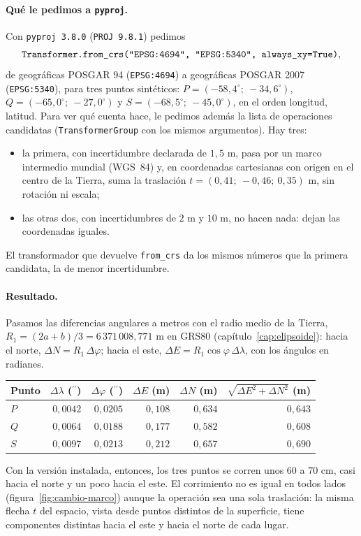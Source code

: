 \paragraph{Qué le pedimos a \texttt{pyproj}.} Con \texttt{pyproj 3.8.0} (\texttt{PROJ 9.8.1}) pedimos
\[
\texttt{Transformer.from\_crs(\textquotedbl{}EPSG:4694\textquotedbl{}, \textquotedbl{}EPSG:5340\textquotedbl{}, always\_xy=True)},
\]
de geográficas POSGAR 94 (\texttt{EPSG:4694}) a geográficas POSGAR 2007 (\texttt{EPSG:5340}),
para tres puntos sintéticos: \(P=(-58{,}4^\circ;\ -34{,}6^\circ)\),
\(Q=(-65{,}0^\circ;\ -27{,}0^\circ)\) y \(S=(-68{,}5^\circ;\ -45{,}0^\circ)\), en el orden
longitud, latitud. Para ver qué cuenta hace, le pedimos además la lista de operaciones
candidatas (\texttt{TransformerGroup} con los mismos argumentos). Hay tres:
\begin{itemize}
  \item la primera, con incertidumbre declarada de \(1{,}5\) m, pasa por un marco intermedio
  mundial (WGS~84) y, en coordenadas cartesianas con origen en el centro de la Tierra, suma la
  traslación \(t=(0{,}41;\ -0{,}46;\ 0{,}35)\) m, sin rotación ni escala;
  \item las otras dos, con incertidumbres de \(2\) m y \(10\) m, no hacen nada: dejan las
  coordenadas iguales.
\end{itemize}
El transformador que devuelve \texttt{from\_crs} da los mismos números que la primera
candidata, la de menor incertidumbre.

\paragraph{Resultado.} Pasamos las diferencias angulares a metros con el radio medio de la
Tierra, \(R_1=(2a+b)/3=6\,371\,008{,}771\) m en GRS80 (capítulo~\ref{cap:elipsoide}): hacia el
norte, \(\Delta N=R_1\,\Delta\varphi\); hacia el este, \(\Delta E=R_1\cos\varphi\,\Delta\lambda\),
con los ángulos en radianes.
\begin{center}
\begin{tabular}{@{}lrrrrr@{}}
\toprule
Punto & \(\Delta\lambda\) (\(^{\prime\prime}\)) & \(\Delta\varphi\) (\(^{\prime\prime}\)) & \(\Delta E\) (m) & \(\Delta N\) (m) & \(\sqrt{\Delta E^2+\Delta N^2}\) (m)\\
\midrule
\(P\) & \(0{,}0042\) & \(0{,}0205\) & \(0{,}108\) & \(0{,}634\) & \(0{,}643\)\\
\(Q\) & \(0{,}0064\) & \(0{,}0188\) & \(0{,}177\) & \(0{,}582\) & \(0{,}608\)\\
\(S\) & \(0{,}0097\) & \(0{,}0213\) & \(0{,}212\) & \(0{,}657\) & \(0{,}690\)\\
\bottomrule
\end{tabular}
\end{center}
Con la versión instalada, entonces, los tres puntos se corren unos \(60\) a \(70\) cm, casi
hacia el norte y un poco hacia el este. El corrimiento no es igual en todos lados
(figura~\ref{fig:cambio-marco}) aunque la operación sea una sola traslación: la misma flecha
\(t\) del espacio, vista desde puntos distintos de la superficie, tiene componentes distintas
hacia el este y hacia el norte de cada lugar.

